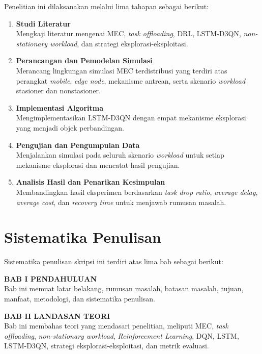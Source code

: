 Penelitian ini dilaksanakan melalui lima tahapan sebagai berikut:
\begin{enumerate}[leftmargin=*, itemsep=0.3ex, topsep=0.4ex]
	\item \textbf{Studi Literatur}\\
	Mengkaji literatur mengenai MEC, \textit{task offloading}, DRL, LSTM-D3QN, \textit{non-stationary workload}, dan strategi eksplorasi-eksploitasi.
	
	\item \textbf{Perancangan dan Pemodelan Simulasi}\\
	Merancang lingkungan simulasi MEC terdistribusi yang terdiri atas perangkat \textit{mobile}, \textit{edge node}, mekanisme antrean, serta skenario \textit{workload} stasioner dan nonstasioner.
	
	\item \textbf{Implementasi Algoritma}\\
	Mengimplementasikan LSTM-D3QN dengan empat mekanisme eksplorasi yang menjadi objek perbandingan.
	
	\item \textbf{Pengujian dan Pengumpulan Data}\\
	Menjalankan simulasi pada seluruh skenario \textit{workload} untuk setiap mekanisme eksplorasi dan mencatat hasil pengujian.
	
	\item \textbf{Analisis Hasil dan Penarikan Kesimpulan}\\
	Membandingkan hasil eksperimen berdasarkan \textit{task drop ratio}, \textit{average delay}, \textit{average cost}, dan \textit{recovery time} untuk menjawab rumusan masalah.
\end{enumerate}

\clearpage
\section{Sistematika Penulisan}
\label{sec:sistematika_penulisan}

Sistematika penulisan skripsi ini terdiri atas lima bab sebagai berikut:

\noindent\textbf{BAB I PENDAHULUAN}\\
Bab ini memuat latar belakang, rumusan masalah, batasan masalah, tujuan, manfaat, metodologi, dan sistematika penulisan.

\vspace{0.5em}
\noindent\textbf{BAB II LANDASAN TEORI}\\
Bab ini membahas teori yang mendasari penelitian, meliputi MEC, \textit{task offloading}, \textit{non-stationary workload}, \textit{Reinforcement Learning}, DQN, LSTM, LSTM-D3QN, strategi eksplorasi-eksploitasi, dan metrik evaluasi.

